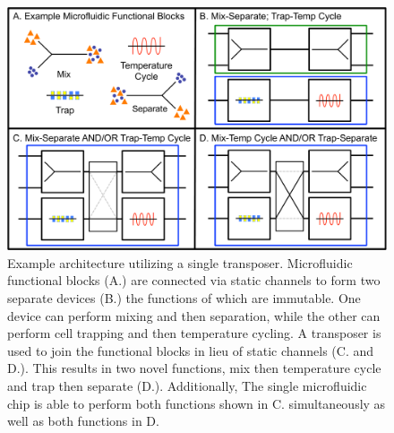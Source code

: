 \begin{figure}[h]
     \begin{minipage}[t]{0.99\linewidth}\centering
      \includegraphics[width=14cm]{fig10.pdf}
      \medskip
     \end{minipage}\hfill
     \caption[Example of a functional, programmable microfluidic architecture]{Example architecture utilizing a single transposer. Microfluidic functional blocks (A.) are connected via static channels to form two separate devices (B.) the functions of which are immutable. One device can perform mixing and then separation, while the other can perform cell trapping and then temperature cycling. A transposer is used to join the functional blocks in lieu of static channels (C. and D.). This results in two novel functions, mix then temperature cycle and trap then separate (D.). Additionally, The single microfluidic chip is able to perform both functions shown in C. simultaneously as well as both functions in D.}
	\label{fig:example}
\end{figure}

